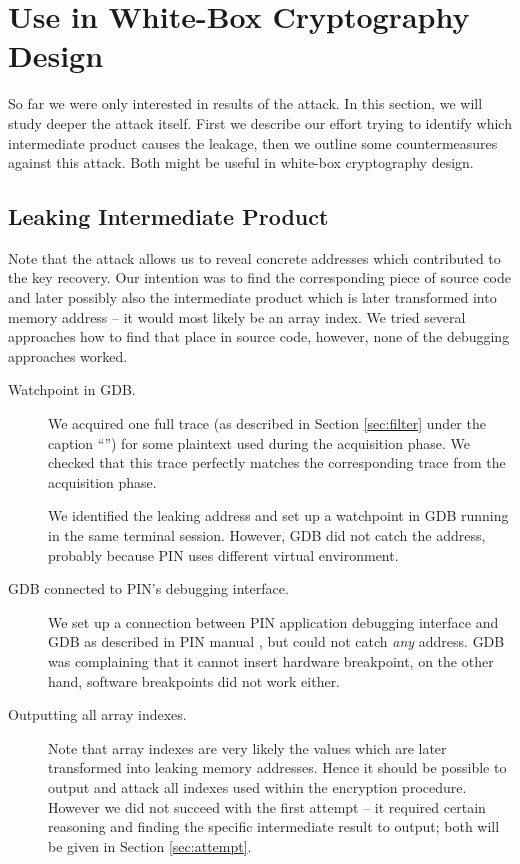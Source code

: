 \section{Use in White-Box Cryptography Design}
\label{sec:useindesign}

So far we were only interested in results of the attack. In this section, we will study deeper the attack itself. First we describe our effort trying to identify which intermediate product causes the leakage, then we outline some countermeasures against this attack. Both might be useful in white-box cryptography design.



\subsection{Leaking Intermediate Product}

Note that the attack allows us to reveal concrete addresses which contributed to the key recovery. Our intention was to find the corresponding piece of source code and later possibly also the intermediate product which is later transformed into memory address -- it would most likely be an array index. We tried several approaches how to find that place in source code, however, none of the debugging approaches worked.

\begin{description}
	\item[Watchpoint in GDB.]
		We acquired one full trace (as described in Section \ref{sec:filter} under the caption ``'') for some plaintext used during the acquisition phase. We checked that this trace perfectly matches the corresponding trace from the acquisition phase.
		
		We identified the leaking address and set up a watchpoint in GDB running in the same terminal session. However, GDB did not catch the address, probably because PIN uses different virtual environment.
	\item[GDB connected to PIN's debugging interface.]
		We set up a connection between PIN application debugging interface and GDB as described in PIN manual \cite{pin214manual}, but could not catch {\em any} address. GDB was complaining that it cannot insert hardware breakpoint, on the other hand, software breakpoints did not work either.
	\item[Outputting all array indexes.]
		Note that array indexes are very likely the values which are later transformed into leaking memory addresses. Hence it should be possible to output and attack all indexes used within the encryption procedure. However we did not succeed with the first attempt -- it required certain reasoning and finding the specific intermediate result to output; both will be given in Section \ref{sec:attempt}.
\end{description}

